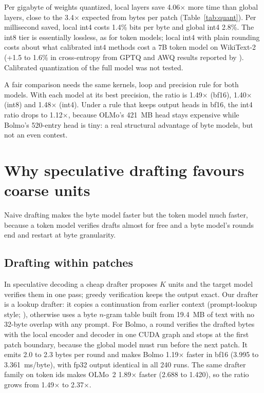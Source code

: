 \documentclass[11pt,a4paper]{article}
\newcommand{\x}{\ensuremath{\times}}
\begin{document}
Per gigabyte of weights quantized, local layers save 4.06\x{} more time than global layers, close to the 3.4\x{} expected from bytes per patch (Table~\ref{tab:quant}). Per millisecond saved, local int4 costs 1.4\% bits per byte and global int4 2.8\%. The int8 tier is essentially lossless, as for token models; local int4 with plain rounding costs about what calibrated int4 methods cost a 7B token model on WikiText-2 (+1.5 to 1.6\% in cross-entropy from GPTQ and AWQ results reported by \citealp{shao2024omniquant}). Calibrated quantization of the full model was not tested.

A fair comparison needs the same kernels, loop and precision rule for both models. With each model at its best precision, the ratio is 1.49\x{} (bf16), 1.40\x{} (int8) and 1.48\x{} (int4). Under a rule that keeps output heads in bf16, the int4 ratio drops to 1.12\x, because OLMo's 421~MB head stays expensive while Bolmo's 520-entry head is tiny: a real structural advantage of byte models, but not an even contest.

\section{Why speculative drafting favours coarse units}

Naive drafting makes the byte model faster but the token model much faster, because a token model verifies drafts almost for free and a byte model's rounds end and restart at byte granularity.

\subsection{Drafting within patches}

In speculative decoding \citep{leviathan2023speculative,chen2023speculative} a cheap drafter proposes $K$ units and the target model verifies them in one pass; greedy verification keeps the output exact. Our drafter is a lookup drafter: it copies a continuation from earlier context (prompt-lookup style; \citealp{saxena2023promptlookup}), otherwise uses a byte $n$-gram table built from 19.4~MB of text with no 32-byte overlap with any prompt. For Bolmo, a round verifies the drafted bytes with the local encoder and decoder in one CUDA graph and stops at the first patch boundary, because the global model must run before the next patch. It emits 2.0 to 2.3 bytes per round and makes Bolmo 1.19\x{} faster in bf16 (3.995 to 3.361~ms/byte), with fp32 output identical in all 240 runs. The same drafter family on token ids makes OLMo~2 1.89\x{} faster (2.688 to 1.420), so the ratio grows from 1.49\x{} to 2.37\x.
\end{document}
